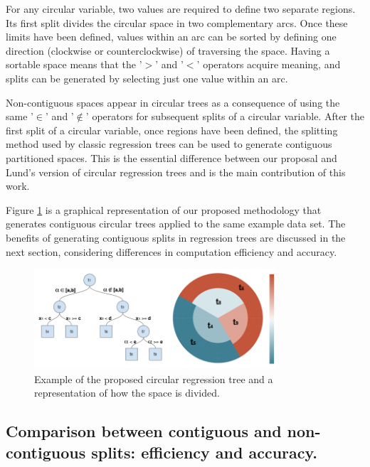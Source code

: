 \documentclass[times,twocolumn,final,authoryear]{elsarticle}
\begin{document}
For any circular variable, two values are required to define two separate regions. Its first split divides the circular space in two complementary arcs. Once these limits have been defined, values within an arc can be sorted by defining one direction (clockwise or counterclockwise) of traversing the space. Having a sortable space means that the '$>$' and '$<$' operators acquire meaning, and splits can be generated by selecting just one value within an arc.

Non-contiguous spaces appear in circular trees as a consequence of using the same '$\in$' and '$\notin$' operators for subsequent splits of a circular variable. After the first split of a circular variable, once regions have been defined, the splitting method used by classic regression trees can be used to generate contiguous partitioned spaces. This is the essential difference between our proposal and Lund's version of circular regression trees and is the main contribution of this work.

Figure \ref{f4} is a graphical representation of our proposed methodology that generates contiguous circular trees applied to the same example data set. The benefits of generating contiguous splits in regression trees are discussed in the next section, considering differences in computation efficiency and accuracy.

%
\begin{figure}
  \includegraphics[width=9cm]{fig4_master.png}
\caption{Example of the proposed circular regression tree and a representation of how the space is divided.}
\label{f4}       %
\end{figure}
%


\subsection{Comparison between contiguous and non-contiguous splits: efficiency and accuracy.} 
\end{document}
